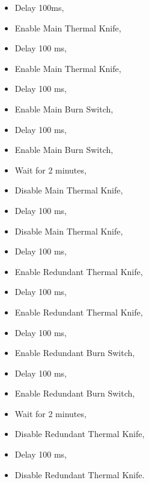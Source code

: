 
\begin{itemize}        
    \item Delay 100ms,                   
                                   
    \item Enable Main Thermal Knife,      
    \item Delay 100 ms,                   
    \item Enable Main Thermal Knife,       
    \item Delay 100 ms,                   
    \item Enable Main Burn Switch,        
    \item Delay 100 ms,                   
    \item Enable Main Burn Switch,         
                            
    \item Wait for 2 minutes,                 
                            
    \item Disable Main Thermal Knife,      
    \item Delay 100 ms,                   
    \item Disable Main Thermal Knife,      
    \item Delay 100 ms,                   
    \item Enable Redundant Thermal Knife,  
    \item Delay 100 ms,                   
    \item Enable Redundant Thermal Knife,  
    \item Delay 100 ms,                   
    \item Enable Redundant Burn Switch,    
    \item Delay 100 ms,                   
    \item Enable Redundant Burn Switch,    
                                
    \item Wait for 2 minutes,                 
                                
    \item Disable Redundant Thermal Knife, 
    \item Delay 100 ms,                   
    \item Disable Redundant Thermal Knife.
\end{itemize}
